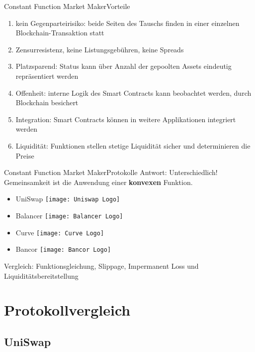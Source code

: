 \documentclass{beamer}
\begin{document}
\begin{frame}{Constant Function Market Maker}{Vorteile}
  \begin{enumerate}
    \item<1->{kein Gegenparteirisiko: beide Seiten des Tauschs finden in einer einzelnen Blockchain-Transaktion statt}
    \item<2->{Zensurresistenz, keine Listungsgebühren, keine Spreads}
    \item<3->{Platzsparend: Status kann über Anzahl der gepoolten Assets eindeutig repräsentiert werden}
    \item<4->{Offenheit: interne Logik des Smart Contracts kann beobachtet werden, durch Blockchain besichert}
    \item<5->{Integration: Smart Contracts können in weitere Applikationen integriert werden}
    \item<6->{Liquidität: Funktionen stellen stetige Liquidität sicher und determinieren die Preise}
  \end{enumerate}
  \vspace{1em}
\end{frame}


\begin{frame}{Constant Function Market Maker}{Protokolle}
	Antwort: Unterschiedlich! Gemeinsamkeit ist die Anwendung einer \textbf{konvexen} Funktion.
	\vspace{1em}
  \begin{itemize}
    \item{UniSwap} \texttt{[image: Uniswap Logo]}
    \item{Balancer} \texttt{[image: Balancer Logo]}
    \item{Curve} \texttt{[image: Curve Logo]}
    \item{Bancor} \texttt{[image: Bancor Logo]}
  \end{itemize}
   \vspace{1em}
    Vergleich: Funktionsgleichung, Slippage, Impermanent Loss und Liquiditätsbereitstellung
\end{frame}


\section{Protokollvergleich}


\subsection{UniSwap}
\end{document}
